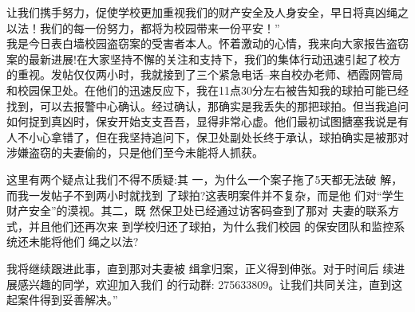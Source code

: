 \documentclass[letterpaper, 12pt]{article}
\begin{document}
\begin{multicols}{2}
让我们携手努力，促使学校更加重视我们的财产安全及人身安全，早日将真凶绳之以法！我们的每一份努力，都将为校园带来一份平安！”\\

我是今日表白墙校园盗窃案的受害者本人。怀着激动的心情，我来向大家报告盗窃案的最新进展!在大家坚持不懈的关注和支持下，我们的集体行动迅速引起了校方的重视。发帖仅仅两小时，我就接到了三个紧急电话--来自校办老师、栖霞网管局和校园保卫处。在他们的迅速反应下，我在11点30分左右被告知我的球拍可能已经找到，可以去报警中心确认。经过确认，那确实是我丢失的那把球拍。但当我追问如何捉到真凶时，保安开始支支吾吾，显得非常心虚。他们最初试图搪塞我说是有人不小心拿错了，但在我坚持追问下，保卫处副处长终于承认，球拍确实是被那对涉嫌盗窃的夫妻偷的，只是他们至今未能将人抓获。

这里有两个疑点让我们不得不质疑:其
一，为什么一个案子拖了5天都无法破
解，而我一发帖子不到两小时就找到
了球拍?这表明案件并不复杂，而是他
们对“学生财产安全”的漠视。其二，既
然保卫处已经通过访客码查到了那对
夫妻的联系方式，并且他们还再次来
到学校归还了球拍，为什么我们校园
的保安团队和监控系统还未能将他们
绳之以法?

我将继续跟进此事，直到那对夫妻被
缉拿归案，正义得到伸张。对于时间后
续进展感兴趣的同学，欢迎加入我们
的行动群:
275633809。让我们共同关注，直到这
起案件得到妥善解决。”
\end{multicols} 
\end{document}
